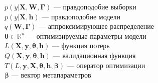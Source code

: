 $p(y|\mathbf{X}, \mathbf{W}, \boldsymbol{\Gamma})$ --- правдоподобие выборки\\
$p(y|\mathbf{X}, \mathbf{h})$ --- правдоподобие модели\\
$q(\mathbf{W}, \boldsymbol{\Gamma})$ --- аппроксимирующее распределение\\
$\boldsymbol{\theta} \in \mathbb{R}^u$ --- оптимизируемые параметры модели\\
$L(\mathbf{X}, \mathbf{y},\boldsymbol{\theta}, \mathbf{h})$ --- функция потерь\\
$Q(\mathbf{X}, \mathbf{y}, \boldsymbol{\theta}, \mathbf{h})$ --- валидационная функция\\
$T(L, \mathbf{y}, \mathbf{X}, \boldsymbol{\theta}, \mathbf{h}, \boldsymbol{\beta})$ --- оператор оптимизации\\
$\boldsymbol{\beta}$ --- вектор метапараметров\\
